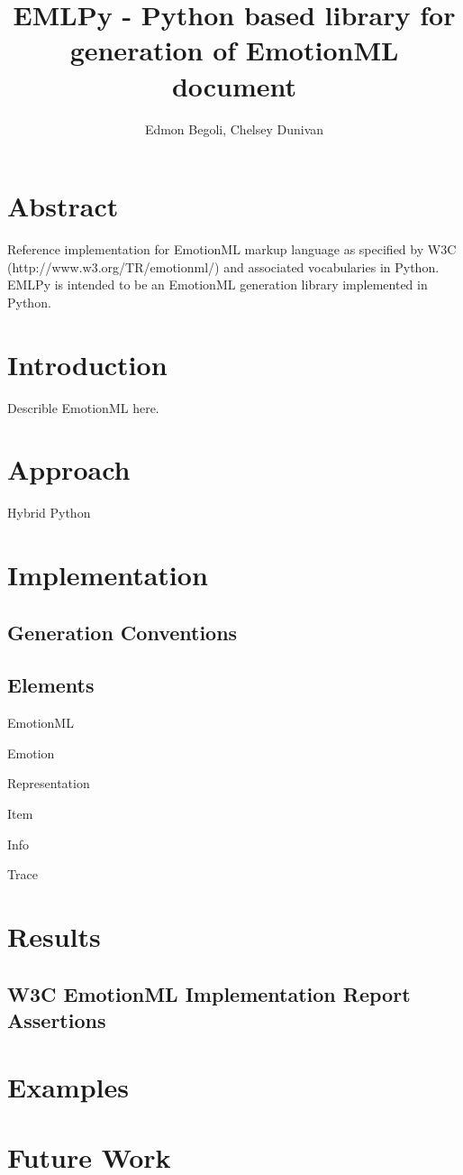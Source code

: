 
\title{EMLPy - Python based library for generation of EmotionML document}

\author{Edmon Begoli, Chelsey Dunivan}

\section{Abstract}

Reference implementation for EmotionML markup language as specified by W3C (http://www.w3.org/TR/emotionml/) 
and associated vocabularies in Python. EMLPy is intended to be an EmotionML generation library implemented in Python.


\section{Introduction}

Describle EmotionML here.

\section{Approach}

Hybrid Python 

\section{Implementation}

\subsection{Generation Conventions}

\subsection{Elements}

EmotionML

Emotion

Representation

Item

Info

Trace

\section{Results}

\subsection{W3C EmotionML Implementation Report Assertions}

\section{Examples}

\section{Future Work}

